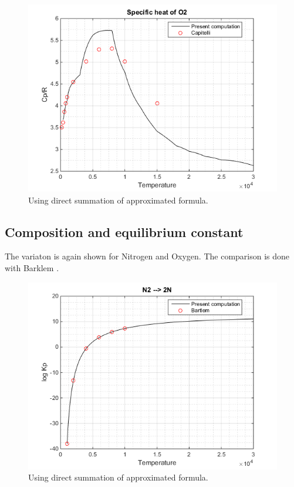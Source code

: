 \documentclass[]{aelab_aiaa-tc}%
\begin{document}
\begin{figure}[h]%
	\includegraphics{CpO2fig}
	\caption{Using direct summation of approximated formula.}
\end{figure}


\subsection{Composition and equilibrium constant}

The variaton is again shown for Nitrogen and Oxygen. The comparison is done with Barklem \cite{Barklem:1}. 

\begin{figure}[h]%
	\includegraphics{KpN2fig}
	\caption{Using direct summation of approximated formula.}
	\end{figure}
\end{document}
